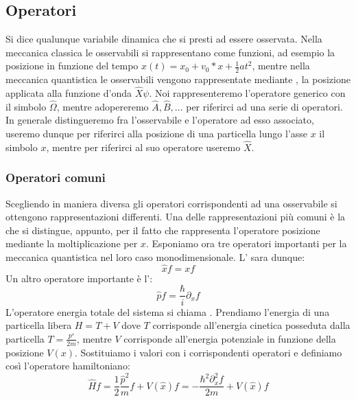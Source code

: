 \subsection{Operatori}
Si dice  qualunque variabile dinamica che si presti ad essere osservata. Nella meccanica classica le osservabili si rappresentano come funzioni, ad esempio la posizione in funzione del tempo $x(t) = x_0 + v_0 * x + \frac{1}{2} a t^2$, mentre nella meccanica quantistica le osservabili vengono rappresentate mediante , la posizione applicata alla funzione d'onda $\hat{X}\psi$. Noi rappresenteremo l'operatore generico con il simbolo $\hat{\Omega}$, mentre adopereremo $\hat{A}, \hat{B}, ...$ per riferirci ad una serie di operatori. In generale distingueremo fra l'osservabile e l'operatore ad esso associato, useremo dunque per riferirci alla posizione di una particella lungo l'asse $x$ il simbolo $x$, mentre per riferirci al suo operatore useremo $\hat{X}$.

\subsubsection{Operatori comuni}
Scegliendo in maniera diversa gli operatori corrispondenti ad una osservabile si ottengono rappresentazioni differenti. Una delle rappresentazioni più comuni è la  che si distingue, appunto, per il fatto che rappresenta l'operatore posizione mediante la moltiplicazione per $x$. Esponiamo ora tre operatori importanti per la meccanica quantistica nel loro caso monodimensionale. L' sara dunque:
$$\hat{x} f = x f$$
Un altro operatore importante è l':
$$\hat{p} f = \frac{\hbar}{i} \partial_x f$$
L'operatore energia totale del sistema si chiama . Prendiamo l'energia di una particella libera $H = T + V$ dove $T$ corrisponde all'energia cinetica posseduta dalla particella $T = \frac{p^s}{2 m}$, mentre $V$ corrisponde all'energia potenziale in funzione della posizione $V(x)$. Sostituiamo i valori con i corrispondenti operatori e definiamo così l'operatore hamiltoniano:
$$\hat{H} f = \frac{1}{2}\frac{\hat{p}^2}{m} f + V(\hat{x}) f = -\frac{\hbar^2 \partial_x^2 f}{2 m} + V(\hat{x}) f$$

